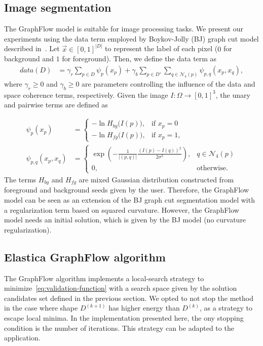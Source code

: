 \documentclass[runningheads]{llncs}
\newcommand{\daniel}[1]{ {\color{blue}#1} }
\begin{document}
\daniel{\subsection{Image segmentation}
The GraphFlow model is suitable for image processing tasks. We present our experiments using the data term employed by Boykov-Jolly (BJ) graph cut model described in~\cite{boykov01graphcut}. Let $\vec{x} \in [0,1]^{|D|}$ to represent the label of each pixel ($0$ for background and $1$ for foreground). Then, we define the data term as
%
\begin{align*}
	data(D) &= \gamma_r \sum_{p \in D}{ \psi_p(x_p) } + \gamma_b \sum_{p \in D'}\sum_{q \in \mathcal{N}_{4}(p)}{\psi_{p,q}(x_p,x_q)},
\end{align*}
where $\gamma_r \geq 0$ and $\gamma_b \geq 0$ are parameters controlling the influence of the data and space coherence terms, respectively. Given the image $I:\Omega \rightarrow [0,1]^3$, the unary and pairwise terms are defined as}
\begin{align*}
	\psi_p(x_p) &= \left\{ \begin{array}{ll}
	-\ln  H_{bg}\big( I(p) \big), & \text{if } x_p=0  \\[1em]	
	-\ln  H_{fg}\big( I(p) \big), & \text{if } x_p=1,
	\end{array}\right.\\[1em]
	\psi_{p,q}(x_p,x_q) &= \left\{ \begin{array}{ll}
	\displaystyle \exp{ \left(- \frac{1}{ |(p,q)| }\frac{(I(p) - I(q))^2}{2\sigma^2} \right) }, & q \in \mathcal{N}_4(p) \\[1em]
	0, & \text{otherwise}.
	\end{array}\right.
\end{align*}
%
\daniel{The terms $H_{bg}$ and $H_{fg}$ are mixed Gaussian distribution constructed from foreground and background seeds given by the user. Therefore, the GraphFlow model can be seen as an extension of the BJ graph cut segmentation model with a regularization term based on squared curvature. However, the GraphFlow model needs an initial solution, which is given by the BJ model (no curvature regularization).}
%

\subsection{Elastica GraphFlow algorithm}
The GraphFlow algorithm implements a local-search strategy to minimize~\eqref{eq:validation-function} with a search
space given by the solution candidates set defined in the previous section. We opted to not stop the method in the case
where shape $D^{(k+1)}$ has higher energy than $D^{(k)}$, as a strategy to escape local minima. In the implementation
presented here, the ony stopping condition is the number of iterations. This strategy can be adapted to the application.
\end{document}
